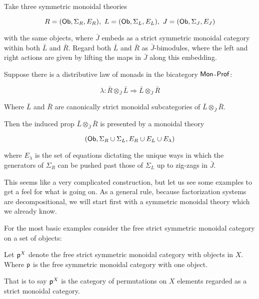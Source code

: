 \begin{lemma}
Take three symmetric monoidal theories

$$
R=({\sf Ob},\Sigma_R ,E_R ), \ L=({\sf Ob},\Sigma_L ,E_L ),  \ J=({\sf Ob},\Sigma_J ,E_J )
$$

with the same objects, where $\bar{J}$ embeds as a strict symmetric monoidal category within both $\bar{L}$ and $\bar{R}$.  Regard both $\bar{L}$ and $\bar{R}$ as  $\bar{J}$-bimodules, where the left and right actions are given by lifting the maps in $\bar{J}$ along this embedding.

Suppose there is a distributive law of monads in the bicategory $\Mon$-$\Prof$:

$$
\lambda:\bar{R}\otimes_{\bar{J}} \bar{L}\Rightarrow \bar{L}\otimes_{\bar{J}} \bar{R}
$$

Where $\bar{L}$ and $\bar{R}$ are canonically strict monoidal subcategories of $\bar{L}\otimes_{\bar{J}} \bar{R}$.

Then the induced prop $\bar{L}\otimes_{\bar{J}} \bar{R}$ is presented by a monoidal theory

$$
({\sf Ob}, \Sigma_R\cup \Sigma_L, E_R\cup E_L \cup E_\lambda)
$$

where $E_\lambda$ is the set of equations dictating the unique ways in which the generators of $\Sigma_R$ can be pushed past those of $\Sigma_L$ up to zig-zags in $\bar{J}$.
\end{lemma}

This seems like a very complicated construction, but let us see some examples to get a feel for what is going on.  As a general rule, because factorization systems are decompositional, we will start first with a symmetric monoidal theory which we already know.

For the most basic examples consider the free strict symmetric monoidal category on a set of objects:

\begin{definition}
Let $\P^X$ denote the free strict symmetric monoidal category with objects in $X$. Where $\P$ is the free symmetric monoidal category with one object.

That is to say $\P^X$ is the category of permutations on $X$ elements regarded as a strict monoidal category.
\end{definition}
%
%


